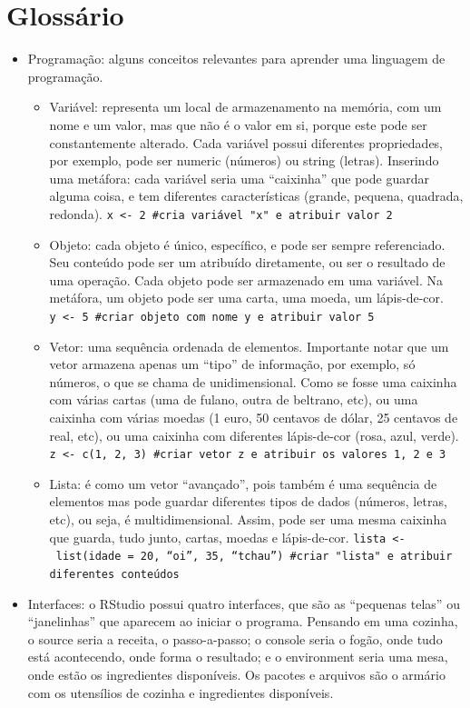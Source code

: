 \documentclass[
  brazil,
]{book}
\providecommand{\tightlist}{%
  \setlength{\itemsep}{0pt}\setlength{\parskip}{0pt}}
\begin{document}
\hypertarget{glossuxe1rio}{%
\chapter{Glossário}\label{glossuxe1rio}}

\begin{itemize}
\tightlist
\item
  Programação: alguns conceitos relevantes para aprender uma linguagem de programação.

  \begin{itemize}
  \tightlist
  \item
    Variável: representa um local de armazenamento na memória, com um nome e um valor, mas que não é o valor em si, porque este pode ser constantemente alterado. Cada variável possui diferentes propriedades, por exemplo, pode ser numeric (números) ou string (letras). Inserindo uma metáfora: cada variável seria uma ``caixinha'' que pode guardar alguma coisa, e tem diferentes características (grande, pequena, quadrada, redonda). \texttt{x\ \textless{}-\ 2\ \#cria\ variável\ "x"\ e\ atribuir\ valor\ 2}
  \item
    Objeto: cada objeto é único, específico, e pode ser sempre referenciado. Seu conteúdo pode ser um atribuído diretamente, ou ser o resultado de uma operação. Cada objeto pode ser armazenado em uma variável. Na metáfora, um objeto pode ser uma carta, uma moeda, um lápis-de-cor. \texttt{y\ \textless{}-\ 5\ \#criar\ objeto\ com\ nome\ y\ e\ atribuir\ valor\ 5}
  \item
    Vetor: uma sequência ordenada de elementos. Importante notar que um vetor armazena apenas um ``tipo'' de informação, por exemplo, só números, o que se chama de unidimensional. Como se fosse uma caixinha com várias cartas (uma de fulano, outra de beltrano, etc), ou uma caixinha com várias moedas (1 euro, 50 centavos de dólar, 25 centavos de real, etc), ou uma caixinha com diferentes lápis-de-cor (rosa, azul, verde). \texttt{z\ \textless{}-\ c(1,\ 2,\ 3)\ \#criar\ vetor\ z\ e\ atribuir\ os\ valores\ 1,\ 2\ e\ 3}
  \item
    Lista: é como um vetor ``avançado'', pois também é uma sequência de elementos mas pode guardar diferentes tipos de dados (números, letras, etc), ou seja, é multidimensional. Assim, pode ser uma mesma caixinha que guarda, tudo junto, cartas, moedas e lápis-de-cor. \texttt{lista\ \textless{}-\ list(idade\ =\ 20,\ “oi”,\ 35,\ “tchau”)\ \#criar\ "lista"\ e\ atribuir\ diferentes\ conteúdos}
  \end{itemize}
\item
  Interfaces: o RStudio possui quatro interfaces, que são as ``pequenas telas'' ou ``janelinhas'' que aparecem ao iniciar o programa. Pensando em uma cozinha, o source seria a receita, o passo-a-passo; o console seria o fogão, onde tudo está acontecendo, onde forma o resultado; e o environment seria uma mesa, onde estão os ingredientes disponíveis. Os pacotes e arquivos são o armário com os utensílios de cozinha e ingredientes disponíveis.


\end{itemize}
\end{document}

